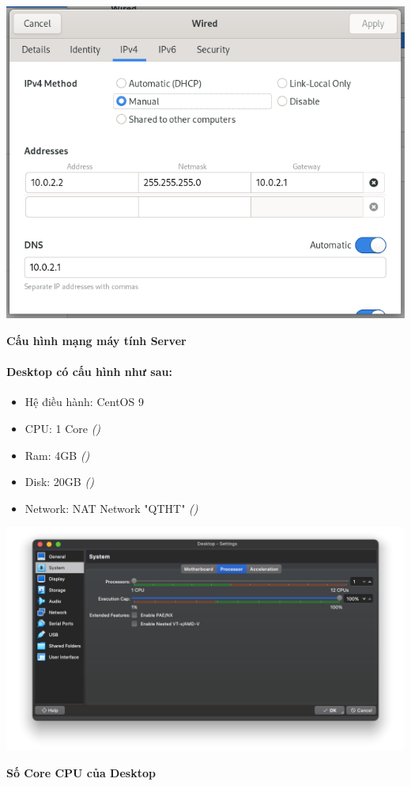 \begin{minipage}{.93\linewidth}
  \captionsetup{type=figure}
  \includegraphics[width=\linewidth]{./imgs/Hinh-7.png}
  \caption{\bfseries Cấu hình mạng máy tính Server}
  \label{fig:server-network-2}
\end{minipage}


\paragraph{Desktop có cấu hình như sau:}

\begin{itemize}
  \item Hệ điều hành: CentOS 9
  \item CPU: 1 Core \textit{()}
  \item Ram: 4GB \textit{()}
  \item Disk: 20GB \textit{()}
  \item Network: NAT Network "QTHT" \textit{()}
\end{itemize}

\begin{minipage}{.93\linewidth}
  \captionsetup{type=figure, skip=-15pt}
  \includegraphics[width=\linewidth]{./imgs/Hinh-9.png}
  \caption{\bfseries Số Core CPU của Desktop}
  \label{fig:desktop-processor}
\end{minipage}



